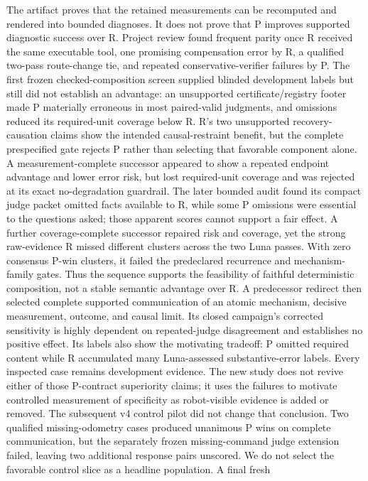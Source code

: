 \documentclass[conference]{IEEEtran}
\begin{document}
The artifact proves that the retained measurements can be recomputed and rendered into bounded
diagnoses. It does not prove that P improves supported diagnostic success over R. Project review
found frequent parity once R received the same executable tool, one promising compensation error
by R, a qualified two-pass route-change tie, and repeated conservative-verifier failures by P.
The first frozen checked-composition screen supplied blinded development labels but still did not
establish an advantage: an unsupported certificate/registry footer made P materially erroneous in
most paired-valid judgments, and omissions reduced its required-unit coverage below R. R's two
unsupported recovery-causation claims show the intended causal-restraint benefit, but the complete
prespecified gate rejects P rather than selecting that favorable component alone.
A measurement-complete successor appeared to show a repeated endpoint advantage and lower error
risk, but lost required-unit coverage and was rejected at its exact no-degradation guardrail. The
later bounded audit found its compact judge packet omitted facts available to R, while some P
omissions were essential to the questions asked; those apparent scores cannot support a fair
effect. A further
coverage-complete successor repaired risk and coverage, yet the strong raw-evidence R missed
different clusters across the two Luna passes. With zero consensus P-win clusters, it failed the
predeclared recurrence and mechanism-family gates. Thus the sequence supports the feasibility of
faithful deterministic composition, not a stable semantic advantage over R. A predecessor redirect
then selected complete supported communication of an atomic mechanism, decisive measurement,
outcome, and causal limit. Its closed campaign's corrected sensitivity is highly dependent on
repeated-judge disagreement and establishes no positive effect. Its labels also show the motivating
tradeoff: P omitted required content while R accumulated many Luna-assessed substantive-error
labels. Every inspected case remains development evidence. The new study does not revive either
of those P-contract superiority claims; it uses the failures to motivate controlled measurement of
specificity as robot-visible evidence is added or removed. The subsequent v4 control pilot did not
change that conclusion.
Two qualified missing-odometry cases produced unanimous P wins on complete communication, but the
separately frozen missing-command judge extension failed, leaving two additional response pairs
unscored. We do not select the favorable control slice as a headline population. A final fresh
\end{document}
